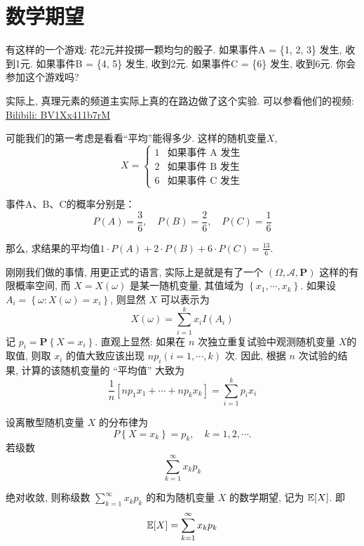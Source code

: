 \section{数学期望}

有这样的一个游戏: 花2元并投掷一颗均匀的骰子. 如果事件A = \{1, 2, 3\} 发生, 收到1元. 如果事件B = \{4, 5\} 发生, 收到2元. 如果事件C = \{6\} 发生, 收到6元. 你会参加这个游戏吗?

\begin{webaside}
    实际上, 真理元素的频道主实际上真的在路边做了这个实验. 可以参看他们的视频: \href{https://www.bilibili.com/video/BV1Xx411b7rM}{Bilibili: BV1Xx411b7rM}
\end{webaside}

可能我们的第一考虑是看看``平均''能得多少. 这样的随机变量$X$, \[
    X =
    \begin{cases}
    1 & \text{如果事件 A 发生} \\
    2 & \text{如果事件 B 发生} \\
    6 & \text{如果事件 C 发生}
    \end{cases}
    \]
    
    事件A、B、C的概率分别是：
    \[P(A) = \frac{3}{6}, \quad P(B) = \frac{2}{6}, \quad P(C) = \frac{1}{6}\]
    
    那么, 求结果的平均值$1 \cdot P(A) + 2 \cdot P(B) + 6 \cdot P(C)= \frac{13}{6}$.

    刚刚我们做的事情, 用更正式的语言, 实际上是就是有了一个 $(\Omega, \mathscr{A}, \mathbf{P})$ 这样的有限概率空间, 而 $X=X(\omega)$ 是某一随机变量, 其值域为 $\left\{x_1, \cdots, x_k\right\}$. 如果设 $A_i=\left\{\omega: X(\omega)=x_i\right\}$, 则显然 $X$ 可以表示为
    $$
    X(\omega)=\sum_{i=1}^k x_i I\left(A_i\right)
    $$记 $p_i=\mathbf{P}\left\{X=x_i\right\}$. 直观上显然: 如果在 $n$ 次独立重复试验中观测随机变量 $X$的取值, 则取 $x_i$ 的值大致应该出现 $n p_i(i=1, \cdots, k)$ 次. 
    因此, 根据 $n$ 次试验的结果, 计算的该随机变量的 ``平均值'' 大致为
    $$
    \frac{1}{n}\left[n p_1 x_1+\cdots+n p_k x_k\right]=\sum_{i=1}^k p_i x_i
    $$

    \begin{definition}[离散型随机变量的期望]
        设离散型随机变量 $X$ 的分布律为
        $$
        P\left\{X=x_k\right\}=p_k, \quad k=1,2, \cdots .
        $$
        若级数
    $$
    \sum_{k=1}^{\infty} x_k p_k
    $$
    
    绝对收敛, 则称级数 $\sum_{k=1}^{\infty} x_k p_k$ 的和为随机变量 $X$ 的数学期望, 记为 $\mathbb E[X]$. 即
    $$
    \mathbb E[X]=\sum_{k=1}^{\infty} x_k p_k
    $$
    \end{definition}

